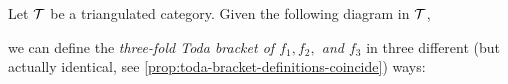 Let \( {\mathcal{T}} \) be a triangulated category. Given the following diagram in \( {\mathcal{T}} \),
\begin{center}
\end{center}
we can define the \emph{three-fold Toda bracket of \( f_1, f_2, \) and \( f_3 \)} in three different (but actually identical, see \autoref{prop:toda-bracket-definitions-coincide}) ways:

